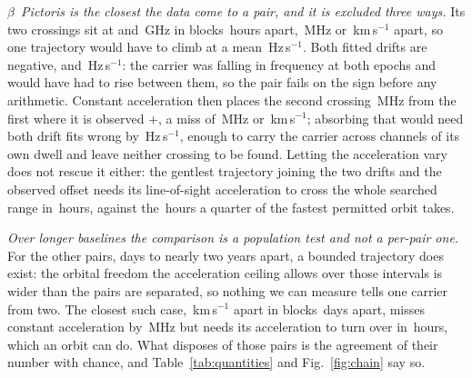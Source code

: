 \emph{\boldmath$\beta$~Pictoris is the closest the data come to a pair, and it
is excluded three ways.} Its two crossings sit at \TjBpNuLo{} and
\TjBpNuHi\,GHz in blocks \TjBpDtH\,hours apart, \TjBpOffMHz\,MHz or
\TjBpDvKms\,km\,s$^{-1}$ apart, so one trajectory would have to climb at a
mean \TjBpMeanReq\,Hz\,s$^{-1}$. Both fitted drifts are negative,
\TjBpDriftLo{} and \TjBpDriftHi\,Hz\,s$^{-1}$: the carrier was falling in
frequency at both epochs and would have had to rise between them, so the pair
fails on the sign before any arithmetic. Constant acceleration then places the
second crossing \TjBpPredMHz\,MHz from the first where it is observed
$+$\TjBpOffMHz, a miss of \TjBpResMHz\,MHz or \TjBpResKms\,km\,s$^{-1}$;
absorbing that would need both drift fits wrong by \TjBpDerr\,Hz\,s$^{-1}$,
enough to carry the carrier across \TjBpSmearCh{} channels of its own dwell
and leave neither crossing to be found. Letting the acceleration vary does not
rescue it either: the gentlest trajectory joining the two drifts and the
observed offset needs its line-of-sight acceleration to cross the whole
searched range in \TjBpTauH\,hours, against the \TjTauOrbH\,hours a quarter of
the fastest permitted orbit takes.

\emph{Over longer baselines the comparison is a population test and not a
per-pair one.} For the other \TjNOpen{} pairs, \TjDtOpenMinD{} days to nearly
two years apart, a bounded trajectory does exist: the orbital freedom the
acceleration ceiling allows over those intervals is wider than the pairs are
separated, so nothing we can measure tells one carrier from two. The closest
such case, \TjHdDvKms\,km\,s$^{-1}$ apart in blocks \TjHdDtD\,days apart,
misses constant acceleration by \TjHdResMHz\,MHz but needs its acceleration to
turn over in \TjHdTauH\,hours, which an orbit can do. What disposes of those
pairs is the agreement of their number with chance, and
Table~\ref{tab:quantities} and Fig.~\ref{fig:chain} say so.

